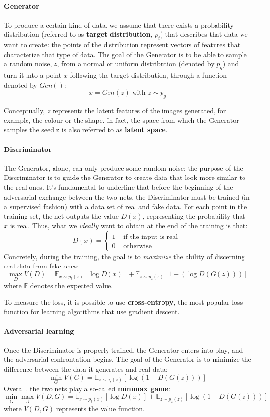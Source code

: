 \documentclass[12pt,a4paper]{book}
\theoremstyle{definition}
\begin{document}
	\paragraph{Generator}
	To produce a certain kind of data, we assume that there exists a probability distribution (referred to as \textbf{target distribution}, $p_t$) that describes that data we want to create: the points of the distribution represent vectors of features that characterize that type of data. The goal of the Generator is to be able to sample a random noise, $z$, from a normal or uniform distribution (denoted by $p_g$) and turn it into a point $x$  following the target distribution, through a function denoted by $Gen()$:
	\[
	x = Gen(z) \text{ with } z \sim p_g
	\]
	
	Conceptually, $z$ represents the latent features of the images generated, for example, the colour or the shape. In fact, the space from which the Generator samples the seed z is also referred to as \textbf{latent space}.
	\paragraph{Discriminator}
	The Generator, alone, can only produce some random noise: the purpose of the Discriminator is to guide the Generator to create data that look more similar to the real ones. It's fundamental to underline that before the beginning of the adversarial exchange between the two nets, the Discriminator must be trained (in a supervised fashion) with a data set of real and fake data.
	For each point in the training set, the net outputs the value $D(x)$, representing the probability that $x$ is real. Thus, what we \textit{ideally} want to obtain at the end of the training is that:
	\[
	D(x) = \begin{cases}
		1 &\text{ if the input is real }\\
		0 & \text{ otherwise }
	\end{cases}
	\]
	Concretely, during the training, the goal is to \textit{maximize} the ability of discerning real data from fake ones:
	\[
	\max_D V(D) = \mathbb{E}_{x\sim p_t(x)}[\log D(x)] + \mathbb{E}_{z\sim p_z(z)}[1-(\log D(G(z)))]
	\]
	where $\mathbb{E}$ denotes the expected value.
	
	To measure the loss, it is possible to use \textbf{cross-entropy}, the most popular loss function for learning algorithms that use gradient descent.
	\paragraph{Adversarial learning}
	Once the Discriminator is properly trained, the Generator enters into play, and the adversarial confrontation begins. The goal of the Generator is to minimize the difference between the data it generates and real data:
	\[
	\min_G V(G) = \mathbb{E}_{z\sim p_z(z)}[\log(1-D(G(z)))]
	\]
	Overall, the two nets play a so-called \textbf{minimax game}:
	\[
	\min_G \max_D V(D,G) = \mathbb{E}_{x\sim p_t(x)}[\log D(x)] + \mathbb{E}_{z\sim p_z(z)}[\log (1-D(G(z)))]
	\]
	where $V(D,G)$ represents the value function.
	
\end{document}
